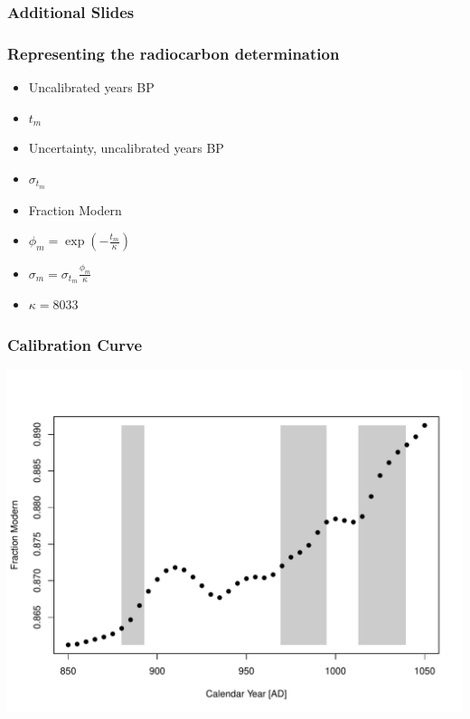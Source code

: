 \documentclass{beamer}
\begin{document}
\begin{frame}[t]
  \frametitle{Additional Slides}
\end{frame}

\begin{frame}[t]
  \frametitle{Representing the radiocarbon determination}
    \begin{itemize}
    \item Uncalibrated years BP
    \item $t_{m}$
    \pause
    \item Uncertainty, uncalibrated years BP
    \item $\sigma_{t_m}$
    \pause
    \item Fraction Modern
    \item $\phi_m = \exp(-\frac{t_m}{\kappa})$
    \item $\sigma_m = \sigma_{t_m} \frac{\phi_m}{\kappa}$
    \item $\kappa=8033$
    \end{itemize}
 
\end{frame}

\begin{frame}[t]
  \frametitle{Calibration Curve}
    \includegraphics[height=.85\textheight]{single_obs_inf_plot2.pdf}
\end{frame}
\end{document}

